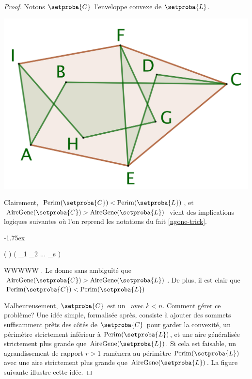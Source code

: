 \begin{proof}
	Notons $\setproba{C}$ l'enveloppe convexe de $\setproba{L}$.
	
	\begin{center}
		\includegraphics[scale=.4]{content/polygon/at-least-one/convex-hull.png}
	\end{center}
	
		
	Clairement, $\perim{\setproba{C}} < \perim{\setproba{L}}$, et $\garea{\setproba{C}} > \garea{\setproba{L}}$ vient des implications logiques suivantes où l'on reprend les notations du fait \ref{ngone-trick}.

    \smallskip
    
    \noindent\kern-1.75ex
    \begin{stepcalc}[style=ar*]
    	\mu(  )
	\explnext{}
    	\mu( _1 \cdot {}_2 \cdot ... \cdot {}_s )
    \end{stepcalc}
	
	
	WWWWW
	 .
	Le donne sans ambiguïté que $\garea{\setproba{C}} > \garea{\setproba{L}}$. De plus, il est clair que $\perim{\setproba{C}} < \perim{\setproba{L}}$

	
	\smallskip
	
	Malheureusement, $\setproba{C}$ est un \kgone\ avec $k < n$. 
	Comment gérer ce problème?
	Une idée simple, formalisée après, consiste à ajouter des sommets suffisamment prêts des côtés de $\setproba{C}$ pour garder la convexité, un périmètre strictement inférieur à $\perim{\setproba{L}}$, et une aire généralisée strictement plus grande que $\garea{\setproba{L}}$. Si cela est faisable, un agrandissement de rapport $r > 1$ ramènera au périmètre $\perim{\setproba{L}}$ avec une aire strictement plus grande que $\garea{\setproba{L}}$.
	La figure suivante illustre cette idée.


\end{proof}
